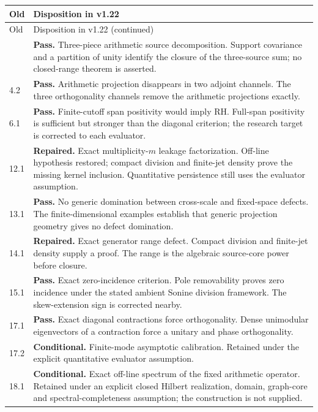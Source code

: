 \documentclass[11pt]{article}
\theoremstyle{remark}
\begin{document}
\small
\begin{longtable}{@{}p{}p{}@{}}
\toprule Old & Disposition in v1.22 \\
\midrule\endfirsthead
\toprule Old & Disposition in v1.22 (continued) \\
\midrule\endhead
\bottomrule\endfoot
4.1 & \textbf{Pass.} Three-piece arithmetic source decomposition. Support covariance and a partition of unity identify the closure of the three-source sum; no closed-range theorem is asserted. \\[4pt]
4.2 & \textbf{Pass.} Arithmetic projection disappears in two adjoint channels. The three orthogonality channels remove the arithmetic projections exactly. \\[4pt]
6.1 & \textbf{Pass.} Finite-cutoff span positivity would imply RH. Full-span positivity is sufficient but stronger than the diagonal criterion; the research target is corrected to each evaluator. \\[4pt]
12.1 & \textbf{Repaired.} Exact multiplicity-$m$ leakage factorization. Off-line hypothesis restored; compact division and finite-jet density prove the missing kernel inclusion. Quantitative persistence still uses the evaluator assumption. \\[4pt]
13.1 & \textbf{Pass.} No generic domination between cross-scale and fixed-space defects. The finite-dimensional examples establish that generic projection geometry gives no defect domination. \\[4pt]
14.1 & \textbf{Repaired.} Exact generator range defect. Compact division and finite-jet density supply a proof. The range is the algebraic source-core power before closure. \\[4pt]
15.1 & \textbf{Pass.} Exact zero-incidence criterion. Pole removability proves zero incidence under the stated ambient Sonine division framework. The skew-extension sign is corrected nearby. \\[4pt]
17.1 & \textbf{Pass.} Exact diagonal contractions force orthogonality. Dense unimodular eigenvectors of a contraction force a unitary and phase orthogonality. \\[4pt]
17.2 & \textbf{Conditional.} Finite-mode asymptotic calibration. Retained under the explicit quantitative evaluator assumption. \\[4pt]
18.1 & \textbf{Conditional.} Exact off-line spectrum of the fixed arithmetic operator. Retained under an explicit closed Hilbert realization, domain, graph-core and spectral-completeness assumption; the construction is not supplied. \\[4pt]

\end{longtable}
\end{document}
